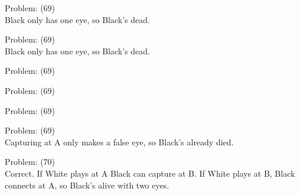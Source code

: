 \documentclass[11pt]{article}
\begin{document}
\begin{minipage}[t]{0.5\textwidth}
  {\centering
  
  Problem: (69)\\
  Black only has one eye, so Black's dead.\\
  }
\end{minipage}
\begin{minipage}[t]{0.5\textwidth}
  {\centering
  
  Problem: (69)\\
  Black only has one eye, so Black's dead.\\
  }
\end{minipage}
\begin{minipage}[t]{0.5\textwidth}
  {\centering
  
  Problem: (69)\\
  
  }
\end{minipage}
\begin{minipage}[t]{0.5\textwidth}
  {\centering
  
  Problem: (69)\\
  
  }
\end{minipage}
\begin{minipage}[t]{0.5\textwidth}
  {\centering
  
  Problem: (69)\\
  
  }
\end{minipage}
\begin{minipage}[t]{0.5\textwidth}
  {\centering
  
  Problem: (69)\\
  Capturing at A only makes a false eye, so Black's already died.\\
  }
\end{minipage}
\begin{minipage}[t]{0.5\textwidth}
  {\centering
  
  Problem: (70)\\
  Correct. If White plays at A Black can capture at B. If White plays at B, Black connects at A, so Black's alive with two eyes.\\
  }
\end{minipage}
\end{document}
